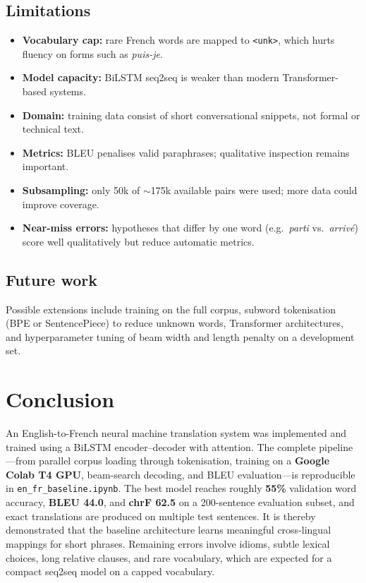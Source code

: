 \documentclass[12pt]{article}
\begin{document}
\subsection{Limitations}
\begin{itemize}
  \item \textbf{Vocabulary cap:} rare French words are mapped to \texttt{<unk>}, which hurts fluency on forms such as \emph{puis-je}.
  \item \textbf{Model capacity:} BiLSTM seq2seq is weaker than modern Transformer-based systems.
  \item \textbf{Domain:} training data consist of short conversational snippets, not formal or technical text.
  \item \textbf{Metrics:} BLEU penalises valid paraphrases; qualitative inspection remains important.
  \item \textbf{Subsampling:} only 50k of $\sim$175k available pairs were used; more data could improve coverage.
  \item \textbf{Near-miss errors:} hypotheses that differ by one word (e.g.\ \emph{parti} vs.\ \emph{arriv\'e}) score well qualitatively but reduce automatic metrics.
\end{itemize}

\subsection{Future work}
Possible extensions include training on the full corpus, subword tokenisation (BPE or SentencePiece) to reduce unknown words, Transformer architectures, and hyperparameter tuning of beam width and length penalty on a development set.

\section{Conclusion}
\label{sec:conclusion}

An English-to-French neural machine translation system was implemented and trained using a BiLSTM encoder--decoder with attention. The complete pipeline---from parallel corpus loading through tokenisation, training on a \textbf{Google Colab T4 GPU}, beam-search decoding, and BLEU evaluation---is reproducible in \texttt{en\_fr\_baseline.ipynb}. The best model reaches roughly \textbf{55\%} validation word accuracy, \textbf{BLEU 44.0}, and \textbf{chrF 62.5} on a 200-sentence evaluation subset, and exact translations are produced on multiple test sentences. It is thereby demonstrated that the baseline architecture learns meaningful cross-lingual mappings for short phrases. Remaining errors involve idioms, subtle lexical choices, long relative clauses, and rare vocabulary, which are expected for a compact seq2seq model on a capped vocabulary.
\end{document}
